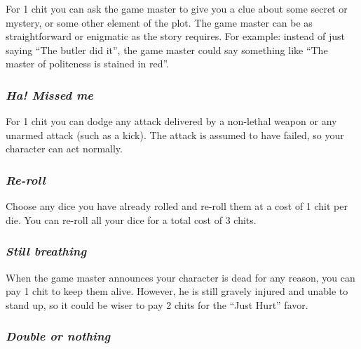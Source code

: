 For 1 chit you can ask the game master to give you a clue about some
secret or mystery, or some other element of the plot. The game master
can be as straightforward or enigmatic as the story requires. For
example: instead of just saying \textquotedblleft{}The butler did
it\textquotedblright{}, the game master could say something like \textquotedblleft{}The
master of politeness is stained in red\textquotedblright{}.


\subsubsection*{\emph{Ha! Missed me}}

For 1 chit you can dodge any attack delivered by a non-lethal weapon
or any unarmed attack (such as a kick). The attack is assumed to have
failed, so your character can act normally. 


\subsubsection*{\emph{Re-roll}}

Choose any dice you have already rolled and re-roll them at a cost
of 1 chit per die. You can re-roll all your dice for a total cost
of 3 chits.


\subsubsection*{\emph{Still breathing}}

When the game master announces your character is dead for any reason,
you can pay 1 chit to keep them alive. However, he is still gravely
injured and unable to stand up, so it could be wiser to pay 2 chits
for the ``Just Hurt'' favor. 


\subsubsection*{\emph{Double or nothing}}

